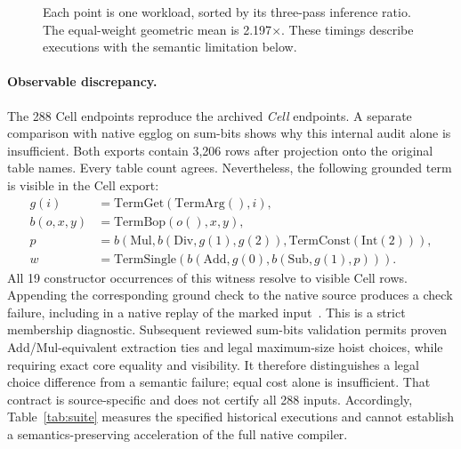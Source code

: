 \documentclass[10pt,letterpaper]{article}
\newcommand{\ratio}[1]{#1\ensuremath{\times}}
\begin{document}
\begin{figure}[ht]
\centering
{}
\caption{Each point is one workload, sorted by its three-pass inference ratio. The equal-weight geometric mean is \ratio{2.197}. These timings describe executions with the semantic limitation below.}
\label{fig:dist}
\end{figure}

\paragraph{Observable discrepancy.}
The 288 Cell endpoints reproduce the archived \emph{Cell} endpoints. A separate comparison with native egglog on sum-bits shows why this internal audit alone is insufficient. Both exports contain 3,206 rows after projection onto the original table names. Every table count agrees. Nevertheless, the following grounded term is visible in the Cell export:
\[
\begin{aligned}
g(i)&=\mathrm{TermGet}(\mathrm{TermArg}(),i),\\
b(o,x,y)&=\mathrm{TermBop}(o(),x,y),\\
p&=b(\mathrm{Mul},b(\mathrm{Div},g(1),g(2)),
                 \mathrm{TermConst}(\mathrm{Int}(2))),\\
w&=\mathrm{TermSingle}(b(\mathrm{Add},g(0),b(\mathrm{Sub},g(1),p))).
\end{aligned}
\]
All 19 constructor occurrences of this witness resolve to visible Cell rows. Appending the corresponding ground check to the native source produces a check failure, including in a native replay of the marked input~\cite{artifact}. This is a strict membership diagnostic. Subsequent reviewed sum-bits validation permits proven Add/Mul-equivalent extraction ties and legal maximum-size hoist choices, while requiring exact core equality and visibility. It therefore distinguishes a legal choice difference from a semantic failure; equal cost alone is insufficient. That contract is source-specific and does not certify all 288 inputs. Accordingly, Table~\ref{tab:suite} measures the specified historical executions and cannot establish a semantics-preserving acceleration of the full native compiler.
\end{document}
